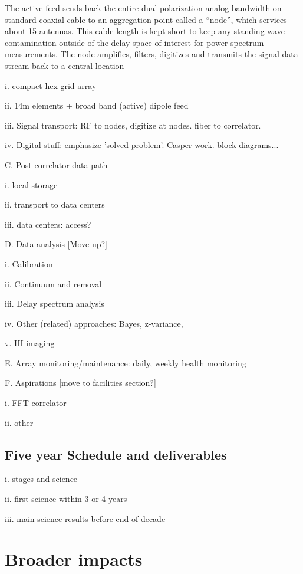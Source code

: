 \documentclass[preprint]{aastex}
\begin{document}
The active feed sends back the entire dual-polarization analog bandwidth on standard
coaxial cable to an aggregation point called a ``node'', which services 
about 15 antennas.  This cable length is kept short to keep any standing
wave contamination outside of the delay-space of interest for power spectrum
measurements.  The node amplifies, filters, digitizes and transmits the signal data stream
back to a central location 

i. compact hex grid array

ii. 14m elements + broad band (active) dipole feed

iii. Signal transport: RF to nodes, digitize at nodes. fiber to correlator. 

iv. Digital stuff: emphasize 'solved problem'. Casper work. block diagrams...

C. Post correlator data path

i. local storage

ii. transport to data centers

iii. data centers: access? 

D. Data analysis [Move up?]

i. Calibration 

ii. Continuum and removal

iii. Delay spectrum analysis

iv. Other (related) approaches: Bayes, z-variance,

v. HI imaging

E. Array monitoring/maintenance: daily, weekly health monitoring

F. Aspirations [move to facilities section?]

i. FFT correlator

ii. other

\subsection{Five year Schedule and deliverables} %

i. stages and science

ii. first science within 3 or 4 years

iii. main science results before end of decade


\section{Broader impacts} %
\end{document}
